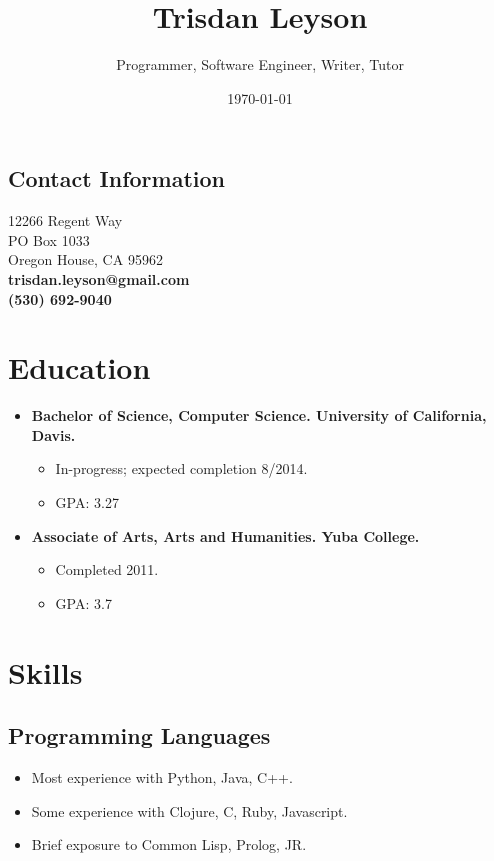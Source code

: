 \documentclass[12pt]{article}
\title{Trisdan Leyson}
\author{Programmer, Software Engineer, Writer, Tutor}
\date{\today}
\begin{document}
\maketitle

\begin{center}
\section*{Contact Information}
\label{sec-1}
12266 Regent Way\\
PO Box 1033\\
Oregon House, CA 95962\\
\textbf{trisdan.leyson@gmail.com}\\
\textbf{(530) 692-9040}\\
\end{center}
\section*{Education}
\label{sec-2}

\begin{itemize}
\item \textbf{Bachelor of Science, Computer Science. University of California, Davis.}
\begin{itemize}
\item In-progress; expected completion 8/2014.
\item GPA: 3.27
\end{itemize}
\item \textbf{Associate of Arts, Arts and Humanities. Yuba College.}
\begin{itemize}
\item Completed 2011.
\item GPA: 3.7
\end{itemize}
\end{itemize}
\section*{Skills}
\label{sec-3}
\subsection*{Programming Languages}
\label{sec-3-1}

\begin{itemize}
\item Most experience with Python, Java, C++.
\item Some experience with Clojure, C, Ruby, Javascript.
\item Brief exposure to Common Lisp, Prolog, JR.
\end{itemize}
\end{document}
